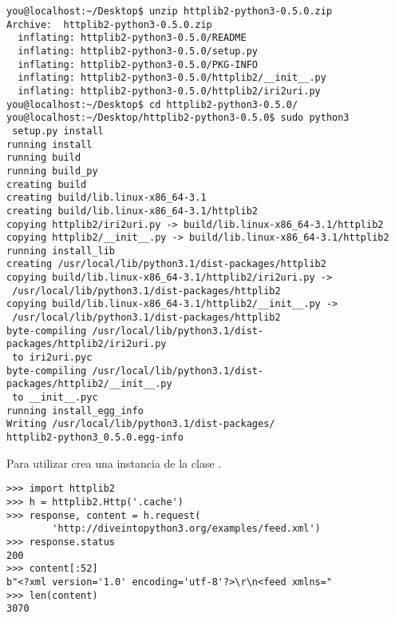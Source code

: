 \noindent\begin{minipage}{\textwidth}
\begin{lstlisting}[mathescape=False]
you@localhost:~/Desktop$ unzip httplib2-python3-0.5.0.zip
Archive:  httplib2-python3-0.5.0.zip
  inflating: httplib2-python3-0.5.0/README
  inflating: httplib2-python3-0.5.0/setup.py
  inflating: httplib2-python3-0.5.0/PKG-INFO
  inflating: httplib2-python3-0.5.0/httplib2/__init__.py
  inflating: httplib2-python3-0.5.0/httplib2/iri2uri.py
you@localhost:~/Desktop$ cd httplib2-python3-0.5.0/
you@localhost:~/Desktop/httplib2-python3-0.5.0$ sudo python3
 setup.py install
running install
running build
running build_py
creating build
creating build/lib.linux-x86_64-3.1
creating build/lib.linux-x86_64-3.1/httplib2
copying httplib2/iri2uri.py -> build/lib.linux-x86_64-3.1/httplib2
copying httplib2/__init__.py -> build/lib.linux-x86_64-3.1/httplib2
running install_lib
creating /usr/local/lib/python3.1/dist-packages/httplib2
copying build/lib.linux-x86_64-3.1/httplib2/iri2uri.py ->
 /usr/local/lib/python3.1/dist-packages/httplib2
copying build/lib.linux-x86_64-3.1/httplib2/__init__.py ->
 /usr/local/lib/python3.1/dist-packages/httplib2
byte-compiling /usr/local/lib/python3.1/dist-packages/httplib2/iri2uri.py
 to iri2uri.pyc
byte-compiling /usr/local/lib/python3.1/dist-packages/httplib2/__init__.py
 to __init__.pyc
running install_egg_info
Writing /usr/local/lib/python3.1/dist-packages/
httplib2-python3_0.5.0.egg-info
\end{lstlisting}
\end{minipage}

Para utilizar  crea una instancia de la clase .

\noindent\begin{minipage}{\textwidth}
\begin{lstlisting}[mathescape=False]
>>> import httplib2
>>> h = httplib2.Http('.cache')
>>> response, content = h.request(
        'http://diveintopython3.org/examples/feed.xml')
>>> response.status            
200
>>> content[:52]              
b"<?xml version='1.0' encoding='utf-8'?>\r\n<feed xmlns="
>>> len(content)
3070
\end{lstlisting}
\end{minipage}

